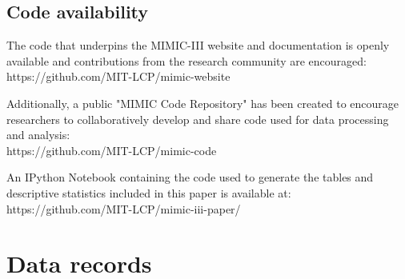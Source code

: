 \documentclass[english]{article}
\begin{document}
\subsection*{Code availability}





The code that underpins the MIMIC-III website and documentation is openly available and contributions from the research community are encouraged: \\ https://github.com/MIT-LCP/mimic-website 

Additionally, a public "MIMIC Code Repository" has been created to encourage researchers to collaboratively develop and share code used for data processing and analysis: \\ https://github.com/MIT-LCP/mimic-code

An IPython Notebook containing the code used to generate the tables and descriptive statistics included in this paper is available at: \\ https://github.com/MIT-LCP/mimic-iii-paper/


\section*{Data records}

\end{document}
